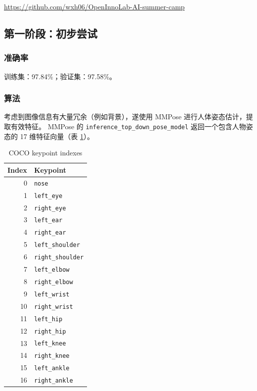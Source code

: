 \documentclass[12pt,titlepage]{article}
\begin{document}
\url{https://github.com/wxh06/OpenInnoLab-AI-summer-camp}

\subsection{第一阶段：初步尝试}

\subsubsection{准确率}

训练集：97.84\%；验证集：97.58\%。

\subsubsection{算法}

考虑到图像信息有大量冗余（例如背景），遂使用 MMPose 进行人体姿态估计，提取有效特征。
MMPose 的 \verb|inference_top_down_pose_model| 返回一个包含人物姿态的 17 维特征向量（表 \ref{tab:coco-keypoints}）。

\begin{table}[h!]
  \centering
  \begin{tabular}{|r|l|}
    \hline
    Index & Keypoint              \\
    \hline
    0     & \verb|nose|           \\
    1     & \verb|left_eye|       \\
    2     & \verb|right_eye|      \\
    3     & \verb|left_ear|       \\
    4     & \verb|right_ear|      \\
    5     & \verb|left_shoulder|  \\
    6     & \verb|right_shoulder| \\
    7     & \verb|left_elbow|     \\
    8     & \verb|right_elbow|    \\
    9     & \verb|left_wrist|     \\
    10    & \verb|right_wrist|    \\
    11    & \verb|left_hip|       \\
    12    & \verb|right_hip|      \\
    13    & \verb|left_knee|      \\
    14    & \verb|right_knee|     \\
    15    & \verb|left_ankle|     \\
    16    & \verb|right_ankle|    \\
    \hline
  \end{tabular}
  \caption{COCO keypoint indexes \cite{TopDownAicDataset}}
  \label{tab:coco-keypoints}
\end{table}
\end{document}
